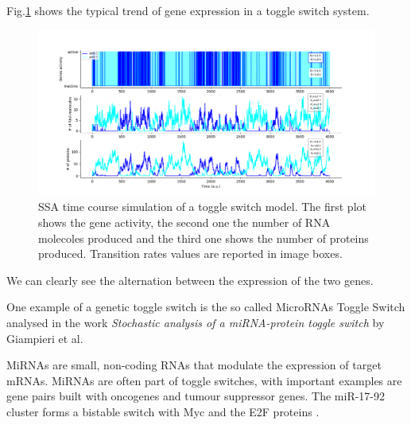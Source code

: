 \documentclass[12pt,a4paper]{report}
\begin{document}
Fig.\ref{toggleswitchtimeplot} shows the typical trend of gene expression in a toggle switch system.

\begin{figure}[!ht]
\hspace*{-2.5cm} 
\includegraphics[scale=0.59]{toggleswitchtimeplotaugeneactivity.png}
\caption{SSA time course simulation of a toggle switch model. The first plot shows the gene activity, the second one the number of RNA molecoles produced and the third one shows the number of proteins produced. Transition rates values are reported in image boxes.}
\label{toggleswitchtimeplot}
\end{figure}
\newpage
We can clearly see the alternation between the expression of the two genes.

One example of a genetic toggle switch is the so called MicroRNAs Toggle Switch analysed in the work \emph{
Stochastic analysis of a miRNA-protein toggle switch} \cite{microRNAs} by Giampieri et al.  

MiRNAs are small, non-coding RNAs
that modulate the expression of target mRNAs. MiRNAs are often part of toggle switches, with important examples
are gene pairs built with oncogenes and tumour suppressor genes. The miR-17-92
cluster forms a bistable switch with Myc and the E2F proteins \cite{microRNAs}.





\end{document}
